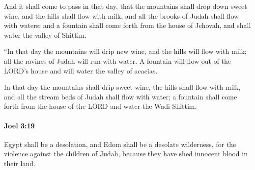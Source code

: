 			\begin{versebox}
					\item[BHS] 
					\item[LXX] 
					\item[ASV] And it shall come to pass in that day, that the mountains shall drop down sweet wine, and the hills shall flow with milk, and all the brooks of Judah shall flow with waters; and a fountain shall come forth from the house of Jehovah, and shall water the valley of Shittim.
					\item[NIV] “In that day the mountains will drip new wine, and the hills will flow with milk; all the ravines of Judah will run with water. A fountain will flow out of the LORD’s house and will water the valley of acacias.
					\item[NRSV] In that day the mountains shall drip sweet wine, the hills shall flow with milk, and all the stream beds of Judah shall flow with water; a fountain shall come forth from the house of the LORD and water the Wadi Shittim.
			\end{versebox}

		\paragraph{Joel 3:19} %
			\label{JOEL-3-19}

			Egypt shall be a desolation, and Edom shall be a desolate wilderness, for the violence against the children of Judah, because they have shed innocent blood in their land.

